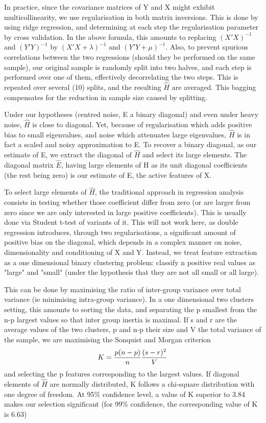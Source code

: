 \documentclass{article}
\begin{document}
In practice, since the covariance matrices of Y and X might exhibit multicollinearity, we use regularisation in both matrix inversions. This is done by using ridge regression, and determining at each step the regularisation parameter by cross validation. In the above formula, this amounts to replacing $(X'X)^{-1}$ and $(Y'Y)^{-1}$ by $(X'X+\lambda)^{-1}$ and $(Y'Y+\mu)^{-1}$. Also, to prevent spurious correlations between the two regressions (should they be performed on the same sample), our original sample is randomly split into two halves, and each step is performed over one of them, effectively decorrelating the two steps. This is repeated over several (10) splits, and the resulting $\hat H$ are averaged. This bagging compensates for the reduction in sample size caused by splitting.

Under our hypotheses (centred noise, E a binary diagonal) and even under heavy noise, $\hat H$ is close to diagonal. Yet, because of regularisation which adds positive bias to small eigenvalues, and noise which attenuates large eigenvalues, $\hat H$ is in fact a scaled and noisy approximation to E. To recover a binary diagonal, as our estimate of E, we extract the diagonal of $\hat H$ and select its large elements. The diagonal matrix $\hat E$, having large elements of H as its unit diagonal coefficients (the rest being zero) is our estimate of E, the active features of X.

To select large elements of $\hat H$, the traditional approach in regression analysis consists in testing whether those coefficient differ from zero (or are larger from zero since we are only interested in large positive coefficients). This is usually done via Student t-test of variants of it. This will not work here, as double regression introduces, through two regularisations, a significant amount of positive bias on the diagonal, which depends in a complex manner on noise, dimensionality and conditioning of X and Y. Instead, we treat feature extraction as a one dimensional binary clustering problem: classify n positive real values as "large" and "small" (under the hypothesis that they are not all small or all large). 

This can be done by maximising the ratio of inter-group variance over total variance (ie minimising intra-group variance). In a one dimensional two clusters setting, this amounts to sorting the data, and separating the p smallest from the n-p largest values so that inter group inertia is maximal. If s and r are the average values of the two clusters, p and n-p their size and V the total variance of the sample, we are maximising the Sonquist and Morgan criterion $$K = {p (n-p) \over n} {(s-r)^2 \over V}$$ and selecting the p features corresponding to the largest values. If diagonal elements of $\hat H$ are normally distributed, K follows a chi-square distribution with one degree of freedom. At 95\% confidence level, a value of K superior to 3.84 makes our selection significant (for 99\% confidence, the corresponding value of K is 6.63) \citep{Kass_75}
\end{document}
